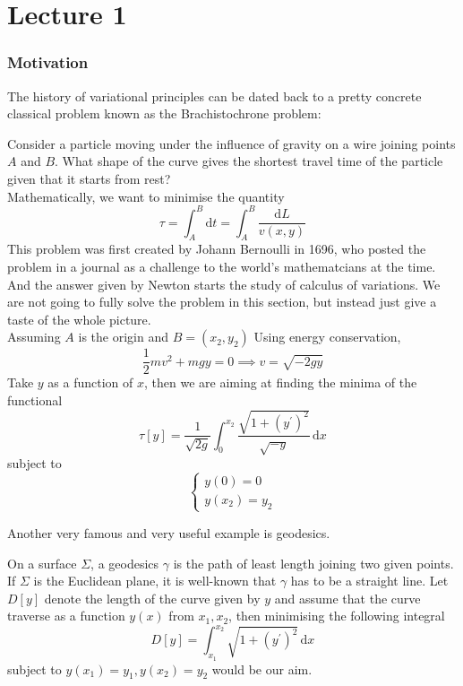 \documentclass[a4paper]{article}
\begin{document}
\maketitle
\tableofcontents
\setcounter{section}{-1}
\newpage
\part*{Lecture 1}
\section{Motivation}
The history of variational principles can be dated back to a pretty concrete classical problem known as the Brachistochrone problem:
\begin{example}
    Consider a particle moving under the influence of gravity on a wire joining points $A$ and $B$.
    What shape of the curve gives the shortest travel time of the particle given that it starts from rest?\\
    Mathematically, we want to minimise the quantity
    $$\tau=\int_A^B\mathrm dt=\int_A^B\frac{\mathrm dL}{v(x,y)}$$
    This problem was first created by Johann Bernoulli in 1696, who posted the problem in a journal as a challenge to the world's mathematcians at the time.
    And the answer given by Newton starts the study of calculus of variations.
    We are not going to fully solve the problem in this section, but instead just give a taste of the whole picture.\\
    Assuming $A$ is the origin and $B=(x_2,y_2)$
    Using energy conservation,
    $$\frac{1}{2}mv^2+mgy=0\implies v=\sqrt{-2gy}$$
    Take $y$ as a function of $x$, then we are aiming at finding the minima of the functional
    $$\tau[y]=\frac{1}{\sqrt{2g}}\int_0^{x_2}\frac{\sqrt{1+(y^\prime)^2}}{\sqrt{-y}}\,\mathrm dx$$
    subject to
    $$\begin{cases}
        y(0)=0\\
        y(x_2)=y_2
    \end{cases}$$
\end{example}
Another very famous and very useful example is geodesics.
\begin{example}[Geodesics]
    On a surface $\Sigma$, a geodesics $\gamma$ is the path of least length joining two given points.
    If $\Sigma$ is the Euclidean plane, it is well-known that $\gamma$ has to be a straight line.
    Let $D[y]$ denote the length of the curve given by $y$ and assume that the curve traverse as a function $y(x)$ from $x_1,x_2$, then minimising the following integral 
    $$D[y]=\int_{x_1}^{x_2}\sqrt{1+(y^\prime)^2}\,\mathrm dx$$
    subject to $y(x_1)=y_1,y(x_2)=y_2$ would be our aim.
\end{example}
\end{document}
